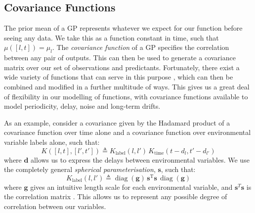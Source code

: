 \documentclass{acmtrans2m}
\newcommand{\vect}[1]{\boldsymbol{#1}}
\newcommand{\mat}[1]{\mathbf{#1}}
\newcommand{\tr}{\mathrm{T}}
\newcommand{\defequal}{\triangleq}
\DeclareMathOperator{\diag}{diag}
\begin{document}
\subsection{Covariance Functions}

\noindent The prior mean of a GP represents whatever we expect for our function before seeing any data. We take this as a function constant in time, such that $\mu([l,t])=\mu_l$. The \emph{covariance function} of a GP specifies the correlation between any pair of outputs. This can then be used to generate a covariance matrix over our set of observations and predictants. Fortunately, there exist a wide variety of functions that can serve in this purpose \cite{Abrahamsen,stein2005stc}, which can then be combined and modified in a further multitude of ways. This gives us a great deal of flexibility in our modelling of functions, with covariance functions available to model periodicity, delay, noise and long-term drifts. 

As an example, consider a covariance given by the Hadamard product of a covariance function over time alone and a covariance function over environmental variable labels alone, such that:  
\begin{equation}
K([l,t],[l',t']) \defequal K_\text{label}(l,l')\, K_\text{time}(t-d_l,t'-d_{l'})
\end{equation}
where $\vect{d}$ allows us to express the delays between environmental variables. We use the completely general \emph{spherical parameterisation}, $\mathbf{s}$, such that:
\begin{equation}
K_\text{label}(l,l') \defequal  \diag(\vect{g})\,\mat{s}^\tr \mat{s}\,\diag(\vect{g})
\end{equation}
where $\vect{g}$ gives an intuitive length scale for each environmental variable, and $\mat{s}^{T}\mat{s}$ is the correlation matrix \cite{PinheiroBates}. This allows us to represent any possible degree of correlation between our variables.
\end{document}
